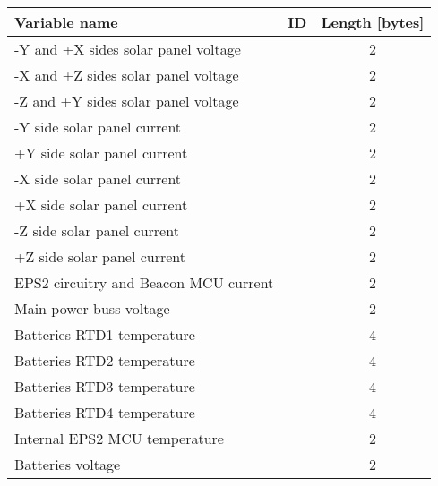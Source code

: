 \begin{table}[!h]
    \centering
    \begin{tabular}{lcc}
        \toprule[1.5pt]
        \textbf{Variable name}                  & \textbf{ID}    &  \textbf{Length [bytes]} \\
        \midrule
        -Y and +X sides solar panel voltage     &                &  2                       \\
        -X and +Z sides solar panel voltage     &                &  2                       \\
        -Z and +Y sides solar panel voltage     &                &  2                       \\
        -Y side solar panel current             &                &  2                       \\
        +Y side solar panel current             &                &  2                       \\
        -X side solar panel current             &                &  2                       \\
        +X side solar panel current             &                &  2                       \\
        -Z side solar panel current             &                &  2                       \\
        +Z side solar panel current             &                &  2                       \\
        EPS2 circuitry and Beacon MCU current   &                &  2                       \\
        Main power buss voltage                 &                &  2                       \\
        Batteries RTD1 temperature              &                &  4                       \\
        Batteries RTD2 temperature              &                &  4                       \\
        Batteries RTD3 temperature              &                &  4                       \\
        Batteries RTD4 temperature              &                &  4                       \\
        Internal EPS2 MCU temperature           &                &  2                       \\
        Batteries voltage                       &                &  2                       \\

\end{tabular}
\end{table}
